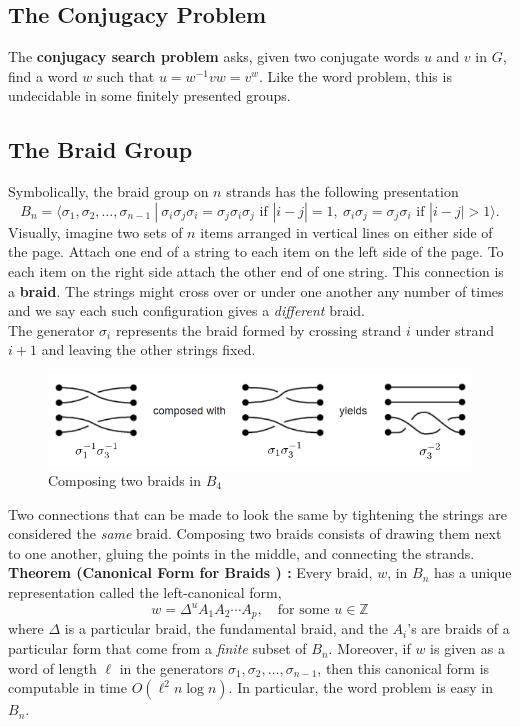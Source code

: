 \documentclass[11pt]{article}
\newcommand{\integers}{\mathbb{Z}}
\begin{document}
\subsection*{The Conjugacy Problem}
The \textbf{conjugacy search problem} asks, given two conjugate words $u$ and $v$ in $G$, find a word $w$ such that $u = w^{-1}vw = v^w$. Like the word problem, this is undecidable in some finitely presented groups.

\subsection*{The Braid Group}
Symbolically, the braid group on $n$ strands has the following presentation
\[
B_n = \langle \sigma_1, \sigma_2, \ldots, \sigma_{n-1}\ |\  \sigma_i\sigma_j\sigma_i = \sigma_j\sigma_i\sigma_j\text{ if }|i-j| = 1,\ \sigma_i\sigma_j = \sigma_j\sigma_i\text{ if }|i-j|>1\rangle.
\]
Visually, imagine two sets of $n$ items arranged in vertical lines on either side of the page. Attach one end of a string to each item on the left side of the page. To each item on the right side attach the other end of one string. This connection is a \textbf{braid}. The strings might cross over or under one another any number of times and we say each such configuration gives a \textit{different} braid.\\
\indent The generator $\sigma_i$ represents the braid formed by crossing strand $i$ under strand $i+1$ and leaving the other strings fixed.
\begin{figure}[h]
\centering
	\includegraphics[scale=.61]{composition.PNG}
\caption{Composing two braids in $B_4$}
\end{figure}

\indent Two connections that can be made to look the same by tightening the strings are considered the \textit{same} braid. Composing two braids consists of drawing them next to one another, gluing the points in the middle, and connecting the strands.\\


\noindent \textbf{Theorem (Canonical Form for Braids \cite{ko2000}) : }Every braid, $w$, in $B_n$ has a unique representation called the left-canonical form,
\[
w = \Delta^uA_1A_2\cdots A_p,\quad \text{for some }u\in \integers
\]
where $\Delta$ is a particular braid, the fundamental braid, and the $A_i$'s are braids of a particular form that come from a \textit{finite} subset of $B_n$. Moreover, if $w$ is given as a word of length $\ell$ in the generators $\sigma_1, \sigma_2, \ldots, \sigma_{n-1}$, then this canonical form is computable in time $O(\ell^2n\log n)$. In particular, the word problem is easy in $B_n$.
\end{document}
